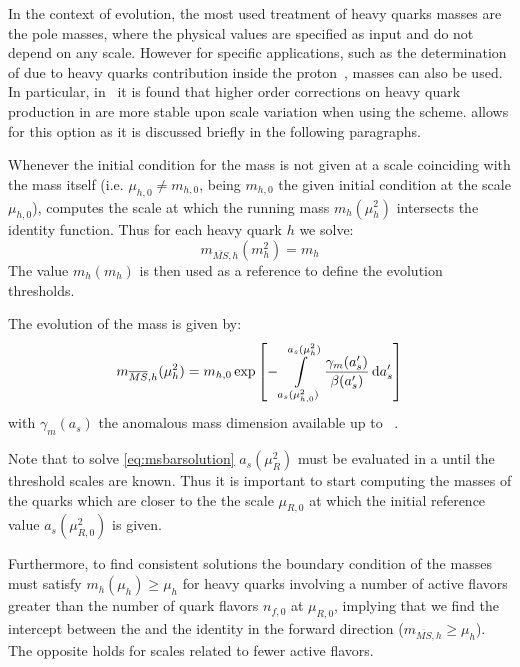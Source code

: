 In the context of \pdf{} evolution, the most used treatment of heavy quarks masses are the pole masses,
where the physical values are specified as input and do not depend on any scale.
However for specific applications, such as the determination of \mhou{} due to heavy quarks contribution 
inside the proton~\cite{Ball:2016neh}, \msbar{} masses can also be used.
In particular, in~\cite{Alekhin:2010sv} it is found that higher order corrections on heavy quark production
in \dis{} are more stable upon scale variation when using the \msbar{} scheme.
\eko{} allows for this option as it is discussed briefly in the following paragraphs.

Whenever the initial condition for the mass is not given at a scale coinciding with
the mass itself (i.e. $\mu_{h,0} \neq m_{h,0}$, being $m_{h,0}$ the given initial condition
at the scale $\mu_{h,0}$),
\eko{} computes the scale at which the running mass $m_{h}(\mu_h^2)$ intersects
the identity function.
Thus for each heavy quark $h$ we solve:
%
\begin{equation}
    m_{\overline{MS},h}(m_h^2) = m_h
\end{equation}
The value $m_h(m_h)$ is then used as a reference to define the evolution thresholds.

The evolution of the \msbar{} mass is given by:
%
\begin{equation}
    m_{\overline{MS},h}(\mu_h^2) = m_{h,0} \exp\qty[ - \int\limits_{a_s(\mu_{h,0}^2)}^{a_s(\mu_h^2)} \frac{\gamma_m(a_s')}{\beta(a_s')} \dd{a_s'} ]
    \label{eq:msbarsolution}
\end{equation}
%
with $\gamma_m(a_s)$ the \qcd{} anomalous mass dimension available up to 
\nnnlo{}~\cite{Vermaseren:1997fq,Schroder:2005hy,Chetyrkin:2005ia}.

Note that to solve \cref{eq:msbarsolution} $a_s(\mu_R^2)$ must be evaluated in 
a \ffns{} until the threshold scales are known. Thus it is important
to start computing the \msbar{} masses of the quarks which are closer to the
the scale $\mu_{R,0}$ at which the initial reference value $a_s(\mu_{R,0}^2)$ is given. 

Furthermore, to find consistent solutions the boundary condition of the
\msbar{} masses must satisfy $m_h(\mu_h) \ge \mu_h$ for heavy quarks involving
a number of active flavors greater than the number of quark flavors $n_{f,0}$ at $\mu_{R,0}$, implying that we find
the intercept between the \rge{} and the identity in the forward direction ($m_{\overline{MS},h} \ge \mu_h$).
The opposite holds for scales related to fewer active flavors.
